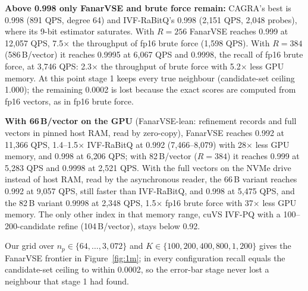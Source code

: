 \documentclass[fleqn,10pt]{wlscirep}
\begin{document}
\textbf{Above 0.998 only FanarVSE and brute force remain:} CAGRA's best is 0.998 (891 QPS, degree 64) and IVF-RaBitQ's 0.998 (2{,}151 QPS, 2{,}048 probes), where its 9-bit estimator saturates. With $R=256$ FanarVSE reaches 0.999 at 12{,}057 QPS, 7.5$\times$ the throughput of fp16 brute force (1{,}598 QPS). With $R=384$ (586\,B/vector) it reaches 0.9995 at 6{,}067 QPS and 0.9998, the recall of fp16 brute force, at 3{,}746 QPS: 2.3$\times$ the throughput of brute force with 5.2$\times$ less GPU memory. At this point stage 1 keeps every true neighbour (candidate-set ceiling 1.000); the remaining 0.0002 is lost because the exact scores are computed from fp16 vectors, as in fp16 brute force.

\textbf{With 66\,B/vector on the GPU} (FanarVSE-lean: refinement records and full vectors in pinned host RAM, read by zero-copy), FanarVSE reaches 0.992 at 11{,}366 QPS, 1.4--1.5$\times$ IVF-RaBitQ at 0.992 (7{,}466--8{,}079) with 28$\times$ less GPU memory, and 0.998 at 6{,}206 QPS; with 82\,B/vector ($R=384$) it reaches 0.999 at 5{,}283 QPS and 0.9998 at 2{,}521 QPS. With the full vectors on the NVMe drive instead of host RAM, read by the asynchronous reader, the 66\,B variant reaches 0.992 at 9{,}057 QPS, still faster than IVF-RaBitQ, and 0.998 at 5{,}475 QPS, and the 82\,B variant 0.9998 at 2{,}348 QPS, 1.5$\times$ fp16 brute force with 37$\times$ less GPU memory. The only other index in that memory range, cuVS IVF-PQ with a 100--200-candidate refine (104\,B/vector), stays below 0.92.

Our grid over $n_p\in\{64,\dots,3{,}072\}$ and $K\in\{100,200,400,800,1{,}200\}$ gives the FanarVSE frontier in Figure~\ref{fig:1m}; in every configuration recall equals the candidate-set ceiling to within 0.0002, so the error-bar stage never lost a neighbour that stage 1 had found.
\end{document}
